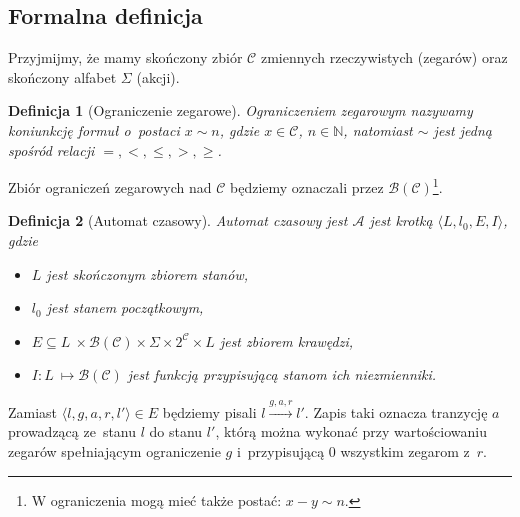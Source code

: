 \documentclass{pracamgr}
\theoremstyle{plain}
\newtheorem{definition}{Definicja}
\begin{document}
\subsection{Formalna definicja} Przyjmijmy, że mamy skończony zbiór
$\mathcal{C}$ zmiennych rzeczywistych (zegarów) oraz skończony alfabet
$\Sigma$ (akcji).
\begin{definition}[Ograniczenie zegarowe] Ograniczeniem zegarowym
nazywamy koniunkcję formuł o~postaci $x \sim n$,
gdzie $x\in\mathcal{C}$, $n \in \mathbb{N}$, natomiast $\sim$
jest jedną spośród relacji \mbox{$=, <, \leq, >, \geq$}.
\end{definition}
Zbiór ograniczeń zegarowych nad $\mathcal{C}$ będziemy oznaczali przez
$\mathcal{B}(\mathcal{C})$\footnote{W \cite{henz-94} ograniczenia mogą
mieć także postać: $x - y \sim n$.}.

\begin{definition}[Automat czasowy] Automat czasowy jest $\mathcal{A}$
jest krotką $\langle L, l_0, E, I\rangle$, gdzie
  \begin{itemize}
    \item $L$ jest skończonym zbiorem stanów,
    \item $l_0$ jest stanem początkowym,
    \item $E \subseteq L~\times \mathcal{B}(\mathcal{C}) \times \Sigma
    \times 2^{\mathcal{C}} \times L$ jest zbiorem krawędzi,
    \item $I: L~\mapsto \mathcal{B}(\mathcal{C})$ jest funkcją
    przypisującą stanom ich niezmienniki.
  \end{itemize}
\end{definition}
Zamiast $\langle l, g, a, r, l' \rangle \in E$ będziemy pisali $l
\stackrel{g, a, r}{\longrightarrow} l'$. Zapis taki oznacza tranzycję
$a$ prowadzącą ze~stanu $l$ do stanu $l'$, którą można
wykonać przy wartościowaniu zegarów spełniającym ograniczenie $g$
i~przypisującą $0$ wszystkim zegarom z~$r$.
\end{document}
